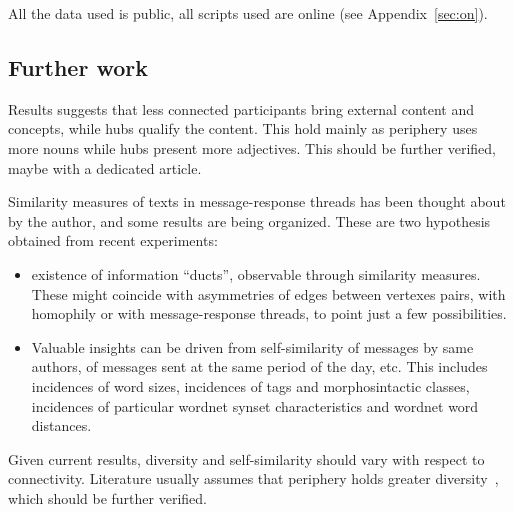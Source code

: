 \documentclass[%
 aip,
 jmp,%
 amsmath,amssymb,
 reprint,%
]{revtex4-1}
\begin{document}
All the data used is public, all scripts used are online (see Appendix~\ref{sec:on}). 

\subsection{Further work}\label{subsec:fw}
Results suggests that less connected participants bring external content and concepts, while hubs qualify the content. This hold mainly as periphery uses more nouns while hubs present more adjectives. This should be further verified, maybe with a dedicated article.

Similarity measures of texts in message-response threads has been thought about by the author, and some results are being organized. These are two hypothesis obtained from recent experiments:
\begin{itemize}
    \item existence of information ``ducts'', observable through similarity measures. These might coincide with asymmetries of edges between vertexes pairs, with homophily or with message-response threads, to point just a few possibilities.
    \item Valuable insights can be driven from self-similarity of messages by same authors, of messages sent at the same period of the day, etc. This includes incidences of word sizes, incidences of tags and morphosintactic classes, incidences of particular wordnet synset characteristics and wordnet word distances.
\end{itemize}

Given current results, diversity and self-similarity should vary with respect to connectivity. Literature usually assumes that periphery holds greater diversity~\cite{easley}, which should be further verified.
\end{document}
